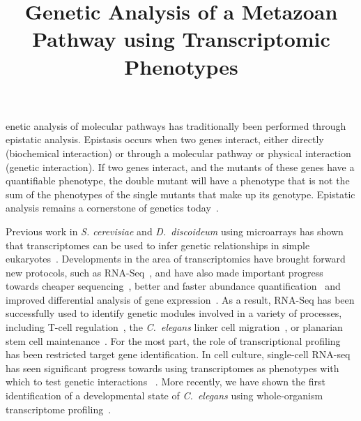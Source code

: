 \documentclass[9pt,twocolumn,twoside]{pnas-new}
\title{Genetic Analysis of a Metazoan Pathway using Transcriptomic Phenotypes}
\newcommand{\cel}{\emph{C.~elegans}}
\newcommand{\dicty}{\emph{D.~discoideum}}
\begin{document}
\verticaladjustment{-2pt}

\maketitle
\thispagestyle{firststyle}

enetic analysis of molecular pathways has traditionally been performed
through epistatic analysis. Epistasis occurs when two genes interact, either
directly (biochemical interaction) or through a molecular pathway or physical
interaction (genetic interaction). If two genes interact, and the mutants of
these genes have a quantifiable phenotype, the double mutant will have a
phenotype that is not the sum of the phenotypes of the single mutants that make
up its genotype. Epistatic analysis remains a cornerstone of genetics
today~\cite{Phillips2008}.

Previous work in \emph{S. cerevisiae} and \dicty{} using microarrays has shown
that transcriptomes can be used to infer genetic relationships in simple
eukaryotes~\cite{Hughes2000, VanDriessche2005}.
Developments in the area of transcriptomics have brought forward new protocols,
such as RNA-Seq~\cite{Mortazavi2008}, and have also made important progress
towards cheaper sequencing~\cite{Metzker2010}, better and faster abundance
quantification~\cite{Patro2014,Bray2016,Patro2015} and improved differential
analysis of gene expression~\cite{Pimentel2016,Trapnell2013}.
As a result, RNA-Seq has been successfully used to identify genetic %
modules involved in a variety of processes, including T-cell
regulation~\cite{Singer2016,Shalek2013}, the \cel{} linker cell
migration~\cite{Schwarz2012}, or planarian stem cell
maintenance~\cite{VanWolfswinkel2014,Scimone2014}. For the most part,
the role of transcriptional profiling has been restricted target gene
identification.
In cell culture, single-cell RNA-seq has seen significant progress towards using
transcriptomes as phenotypes with which to test genetic interactions
~\cite{Adamson2016,Dixit2016}.
More recently, we have shown the first identification of a developmental state
of \cel{} using whole-organism transcriptome profiling~\cite{Angeles-Albores2016a}.
\end{document}
